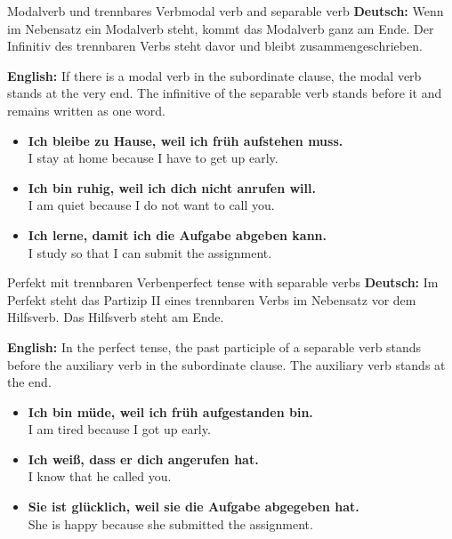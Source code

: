 \documentclass[a4paper,11pt]{article}
\newcommand{\GermanText}[1]{\textbf{Deutsch: }#1\par}
\newcommand{\EnglishText}[1]{{\small\color{SoftGray}\textbf{English: }#1\par}}
\newcommand{\ExampleItem}[2]{\item \textbf{#1}\\{\small\color{SoftGray}#2}}
\begin{document}
        \begin{grammarentry}{Modalverb und trennbares Verb}{modal verb and separable verb}
            \GermanText{Wenn im Nebensatz ein Modalverb steht, kommt das Modalverb ganz am Ende. Der Infinitiv des trennbaren Verbs steht davor und bleibt zusammengeschrieben.}
            \EnglishText{If there is a modal verb in the subordinate clause, the modal verb stands at the very end. The infinitive of the separable verb stands before it and remains written as one word.}
            
            \begin{exbox}
                \begin{itemize}
                    \ExampleItem{Ich bleibe zu Hause, weil ich früh aufstehen muss.}{I stay at home because I have to get up early.}
                    \ExampleItem{Ich bin ruhig, weil ich dich nicht anrufen will.}{I am quiet because I do not want to call you.}
                    \ExampleItem{Ich lerne, damit ich die Aufgabe abgeben kann.}{I study so that I can submit the assignment.}
                \end{itemize}
            \end{exbox}
        \end{grammarentry}
        
        \begin{grammarentry}{Perfekt mit trennbaren Verben}{perfect tense with separable verbs}
            \GermanText{Im Perfekt steht das Partizip II eines trennbaren Verbs im Nebensatz vor dem Hilfsverb. Das Hilfsverb steht am Ende.}
            \EnglishText{In the perfect tense, the past participle of a separable verb stands before the auxiliary verb in the subordinate clause. The auxiliary verb stands at the end.}
            
            \begin{exbox}
                \begin{itemize}
                    \ExampleItem{Ich bin müde, weil ich früh aufgestanden bin.}{I am tired because I got up early.}
                    \ExampleItem{Ich weiß, dass er dich angerufen hat.}{I know that he called you.}
                    \ExampleItem{Sie ist glücklich, weil sie die Aufgabe abgegeben hat.}{She is happy because she submitted the assignment.}
                \end{itemize}
            \end{exbox}
        \end{grammarentry}
        
\end{document}
